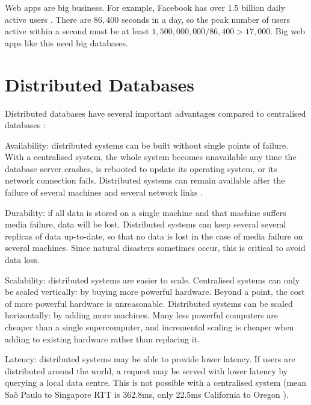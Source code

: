 \documentclass[12pt,a4paper,twoside,openany]{report}
\begin{document}
Web apps are big business. For example, Facebook has over 1.5 billion daily active users \cite{facebook}. There are $86,400$ seconds in a day, so the peak number of users active within a second must be at least $1,500,000,000/86,400 > 17,000$.
Big web apps like this need big databases.

\section{Distributed Databases}

Distributed databases have several important advantages compared to centralised databases \cite{lake2013}:

\begin{description}

\item{Availability}: distributed systems can be built without single points of failure. With a centralised system, the whole system becomes unavailable any time the database server crashes, is rebooted to update its operating system, or its network connection fails. Distributed systems can remain available after the failure of several machines and several network links \cite{bacon2003operating}. %

\item{Durability}: if all data is stored on a single machine and that machine suffers media failure, data will be lost. Distributed systems can keep several several replicas of data up-to-date, so that no data is lost in the case of media failure on several machines. Since natural disasters sometimes occur, this is critical to avoid data loss.

\item{Scalability}: distributed systems are easier to scale. Centralised systems can only be scaled vertically: by buying more powerful hardware. Beyond a point, the cost of more powerful hardware is unreasonable. Distributed systems can be scaled horizontally: by adding more machines. Many less powerful computers are cheaper than a single supercomputer, and incremental scaling is cheaper when adding to existing hardware rather than replacing it.

\item{Latency}: distributed systems may be able to provide lower latency. If users are distributed around the world, a request may be served with lower latency by querying a local data centre. This is not possible with a centralised system (mean Sa\~o Paulo to Singapore RTT is 362.8ms, only 22.5ms California to Oregon \cite{bailis2013highly}).

\end{description}
\end{document}

